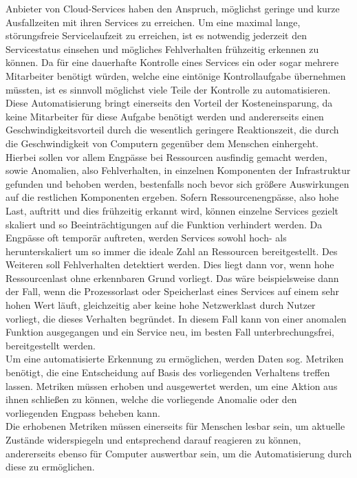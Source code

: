 \documentclass[a4paper,10pt]{scrartcl}
\begin{document}
Anbieter von Cloud-Services haben den Anspruch, möglichst geringe und kurze Ausfallzeiten mit ihren Services zu erreichen. Um eine maximal lange, störungsfreie Servicelaufzeit zu erreichen, ist es notwendig jederzeit den Servicestatus einsehen und mögliches Fehlverhalten frühzeitig erkennen zu können. 
Da für eine dauerhafte Kontrolle eines Services ein oder sogar mehrere Mitarbeiter benötigt würden, welche eine eintönige Kontrollaufgabe übernehmen müssten, ist es sinnvoll möglichst viele Teile der Kontrolle zu automatisieren. Diese Automatisierung bringt einerseits den Vorteil der Kosteneinsparung, da keine Mitarbeiter für diese Aufgabe benötigt werden und andererseits einen Geschwindigkeitsvorteil durch die wesentlich geringere Reaktionszeit, die durch die Geschwindigkeit von Computern gegenüber dem Menschen einhergeht.\\
Hierbei sollen vor allem Engpässe bei Ressourcen ausfindig gemacht werden, sowie Anomalien, also Fehlverhalten, in einzelnen Komponenten der Infrastruktur gefunden und behoben werden, bestenfalls noch bevor sich größere Auswirkungen auf die restlichen Komponenten ergeben.
Sofern Ressourcenengpässe, also hohe Last, auftritt und dies frühzeitig erkannt wird, können einzelne Services gezielt skaliert und so Beeinträchtigungen auf die Funktion verhindert werden. Da Engpässe oft temporär auftreten, werden Services sowohl hoch- als herunterskaliert um so immer die ideale Zahl an Ressourcen bereitgestellt.
Des Weiteren soll Fehlverhalten detektiert werden. Dies liegt dann vor, wenn hohe Ressourcenlast ohne erkennbaren Grund vorliegt. Das wäre beispielsweise dann der Fall, wenn die Prozessorlast oder Speicherlast eines Services auf einem sehr hohen Wert läuft, gleichzeitig aber keine hohe Netzwerklast durch Nutzer vorliegt, die dieses Verhalten begründet. In diesem Fall kann von einer anomalen Funktion ausgegangen und ein Service neu, im besten Fall unterbrechungsfrei, bereitgestellt werden. \\
Um eine automatisierte Erkennung zu ermöglichen, werden Daten sog. Metriken benötigt, die eine Entscheidung auf Basis des vorliegenden Verhaltens treffen lassen. Metriken müssen erhoben und ausgewertet werden, um eine Aktion aus ihnen schließen zu können, welche die vorliegende Anomalie oder den vorliegenden Engpass beheben kann.\\
Die erhobenen Metriken müssen einerseits für Menschen lesbar sein, um aktuelle Zustände widerspiegeln und entsprechend darauf reagieren zu können, andererseits ebenso für Computer auswertbar sein, um die Automatisierung durch diese zu ermöglichen.\\
\end{document}
